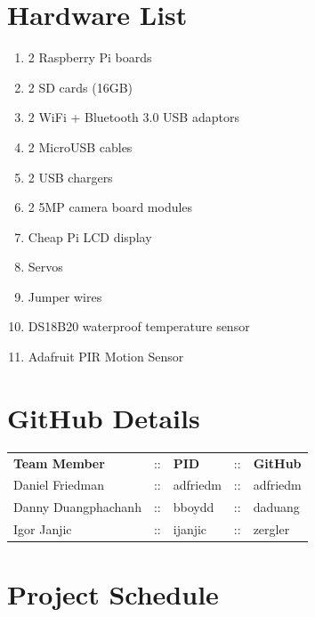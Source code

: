 \section{Hardware List}
\begin{enumerate}
    \item 2 Raspberry Pi boards \cmark
    \item 2 SD cards (16GB) \cmark
    \item 2 WiFi + Bluetooth 3.0 USB adaptors \cmark
    \item 2 MicroUSB cables \cmark
    \item 2 USB chargers \cmark
    \item 2 5MP camera board modules \cmark
    \item Cheap Pi LCD display \xmark
    \item Servos \cmark
    \item Jumper wires \xmark
    \item DS18B20 waterproof temperature sensor \xmark
    \item Adafruit PIR Motion Sensor \xmark

\end{enumerate}

\section{GitHub Details}
\begin{tabular}{ l c l c l}
    \textbf{Team Member} & :: & \textbf{PID} & :: & \textbf{GitHub} \\
    Daniel Friedman      & :: & adfriedm     & :: & adfriedm        \\
    Danny Duangphachanh  & :: & bboydd       & :: & daduang         \\
    Igor Janjic          & :: & ijanjic      & :: & zergler
\end{tabular}

\section{Project Schedule}

